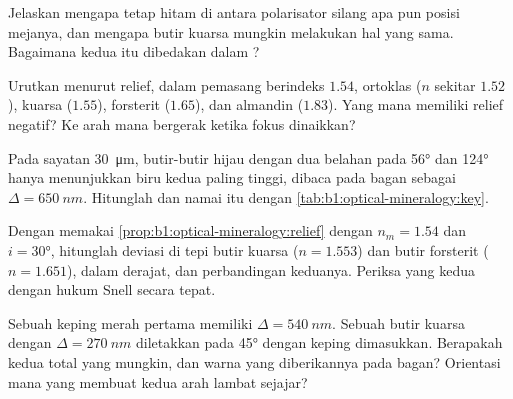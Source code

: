 \begin{exercise}[$\star$]\label{exo:b1:optical-mineralogy:3}
Jelaskan mengapa  tetap hitam di antara polarisator silang apa pun posisi mejanya, dan mengapa butir kuarsa mungkin melakukan hal yang sama. Bagaimana kedua  itu dibedakan dalam ?
\end{exercise}

\begin{exercise}[$\star$]\label{exo:b1:optical-mineralogy:4}
Urutkan menurut relief, dalam pemasang berindeks $1.54$, ortoklas ($n$ sekitar $1.52$), kuarsa ($1.55$), forsterit ($1.65$), dan almandin ($1.83$). Yang mana memiliki relief negatif? Ke arah mana  bergerak ketika fokus dinaikkan?
\end{exercise}

\begin{exercise}[$\star\star$]\label{exo:b1:optical-mineralogy:5}
Pada sayatan \qty{30}{\micro m}, butir-butir  hijau  dengan dua belahan pada \ang{56} dan \ang{124} hanya menunjukkan biru  kedua paling tinggi, dibaca pada bagan sebagai $\Delta = \qty{650}{nm}$. Hitunglah  dan namai  itu dengan \cref{tab:b1:optical-mineralogy:key}.
\end{exercise}

\begin{exercise}[$\star\star$]\label{exo:b1:optical-mineralogy:6}
Dengan memakai \cref{prop:b1:optical-mineralogy:relief} dengan $n_m = 1.54$ dan $i = \ang{30}$, hitunglah deviasi di tepi butir kuarsa ($n = 1.553$) dan butir forsterit ($n = 1.651$), dalam derajat, dan perbandingan keduanya. Periksa yang kedua dengan hukum Snell secara tepat.
\end{exercise}

\begin{exercise}[$\star\star$]\label{exo:b1:optical-mineralogy:7}
Sebuah keping merah  pertama memiliki $\Delta = \qty{540}{nm}$. Sebuah butir kuarsa dengan $\Delta = \qty{270}{nm}$ diletakkan pada \ang{45} dengan keping dimasukkan. Berapakah kedua  total yang mungkin, dan warna yang diberikannya pada bagan? Orientasi mana yang membuat kedua arah lambat sejajar?
\end{exercise}

